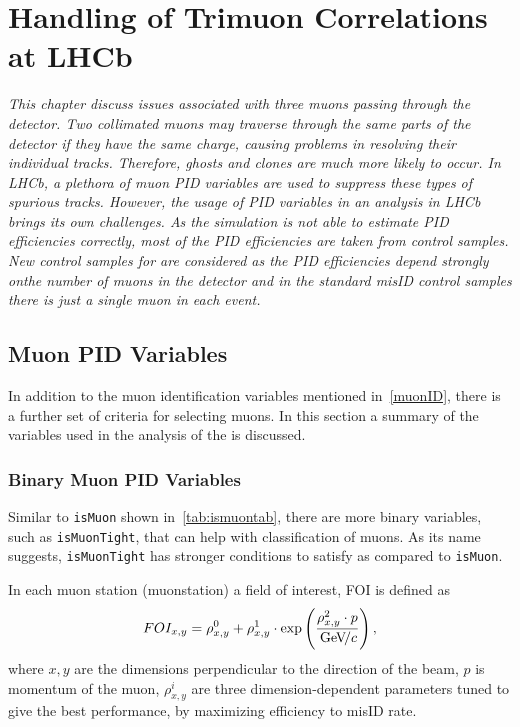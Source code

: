 \chapter{Handling of Trimuon Correlations at LHCb}
\label{chap:trimuon}


\textit{This chapter discuss issues associated with three muons passing through the detector. Two collimated muons may traverse through the same parts of the detector if they have the same charge, causing problems in resolving their individual tracks. Therefore, ghosts and clones are much more likely to occur. In LHCb, a plethora of muon \Gls{PID} variables are used to suppress these types of spurious tracks. However, the usage of \gls{PID} variables in an analysis in \gls{LHCb} brings its own challenges. As the simulation is not able to estimate \gls{PID} efficiencies correctly, most of the \gls{PID} efficiencies are taken from control samples. New control samples for \Bmumumu are considered as the \Gls{PID} efficiencies depend strongly onthe number of muons in the detector and in the standard misID control samples there is just a single muon in each event.}

\color{black}

\section{Muon PID Variables}
\label{otherpid}
In addition to the muon identification variables mentioned in~\autoref{muonID}, there is a further set of criteria for selecting muons. In this section a summary of the variables used in the analysis of the \Bmumumu is discussed.

\subsection{Binary Muon PID Variables }
Similar to \texttt{isMuon} shown in~\autoref{tab:ismuontab}, there are more binary variables, such as \texttt{isMuonTight}, that can help with classification of muons. As its name suggests, \texttt{isMuonTight} has stronger conditions to satisfy as compared to \texttt{isMuon}. 

In each muon station (\gls{muonstation}) a field of interest, \gls{FOI} is defined as %
\begin{equation}
	FOI_{x,y}=\rho^{0}_{x,y}+\rho^{1}_{x,y}\cdot \exp \left(\frac{\rho^{2}_{x,y}\cdot p}{{\mathrm{\,Ge\kern -0.1em V\!/}c}} \right),
\end{equation}
where $x,y$ are the dimensions perpendicular to the direction of the beam, $p$ is momentum of the muon, $\rho^{i}_{x,y}$ are three dimension-dependent parameters tuned to give the best performance, by maximizing efficiency to misID rate.

